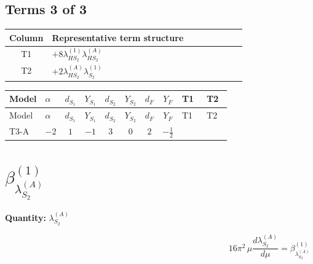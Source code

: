 \documentclass[8pt]{article}
\begin{document}
\begin{landscape}
\subsection*{Terms 3 of 3}
\begin{center}
\begin{tabular}{@{}c >{\raggedright\arraybackslash}p{0.82\linewidth}@{}}
\toprule
Column & Representative term structure \\
\midrule
T1 & \(\displaystyle +8 {\lambda_{HS_2}^{(1)}} {\lambda_{HS_2}^{(A)}}\) \\
\midrule
T2 & \(\displaystyle +2 {\lambda_{HS_2}^{(A)}} {\lambda_{S_2}^{(1)}}\) \\
\midrule
\bottomrule
\end{tabular}
\end{center}
\smallskip
\tiny
\begin{longtable}{@{}llcccccc >{\raggedright\arraybackslash}p{0.21\linewidth} >{\raggedright\arraybackslash}p{0.21\linewidth}@{}}
\toprule
Model & $\alpha$ & $d_{S_1}$ & $Y_{S_1}$ & $d_{S_2}$ & $Y_{S_2}$ & $d_F$ & $Y_F$ & T1 & T2 \\
\midrule
\endfirsthead
\toprule
Model & $\alpha$ & $d_{S_1}$ & $Y_{S_1}$ & $d_{S_2}$ & $Y_{S_2}$ & $d_F$ & $Y_F$ & T1 & T2 \\
\midrule
\endhead
T3-A & $-2$ & $1$ & $-1$ & $3$ & $0$ & $2$ & $-\frac{1}{2}$ & \scriptsize\adjustbox{max width=\linewidth}{$\begin{gathered} +8 {\lambda_{HS_2}^{(1)}} {\lambda_{HS_2}^{(A)}}\end{gathered}$} & \scriptsize\adjustbox{max width=\linewidth}{$\begin{gathered} +2 {\lambda_{HS_2}^{(A)}} {\lambda_{S_2}^{(1)}}\end{gathered}$} \\
\midrule
\bottomrule
\end{longtable}
\clearpage
\section*{$\beta_{\lambda_{S_2}^{(A)}}^{(1)}$}
\noindent\textbf{Quantity: }$\lambda_{S_2}^{(A)}$\par\smallskip
\[16\pi^2\,\mu\frac{d \lambda_{S_2}^{(A)}}{d\mu}=\beta_{\lambda_{S_2}^{(A)}}^{(1)}\]

\end{landscape}
\end{document}

